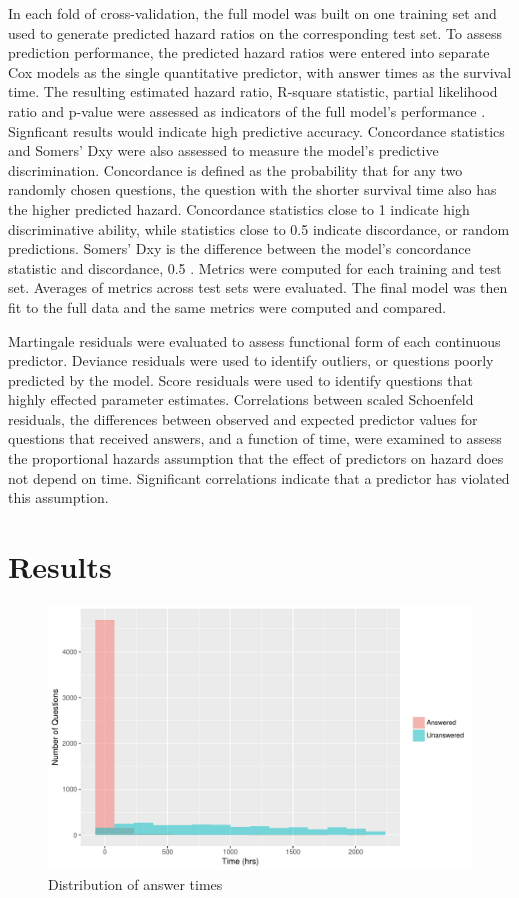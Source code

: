 \documentclass{article}
\begin{document}
In each fold of cross-validation, the full model was built on one training set and used to generate predicted hazard ratios on the corresponding test set. To assess prediction performance, the predicted hazard ratios were entered into separate Cox models as the single quantitative predictor, with answer times as the survival time. The resulting estimated hazard ratio, R-square statistic, partial likelihood ratio and p-value were assessed as indicators of the full model's performance \citep{Chen}. Signficant results would indicate high predictive accuracy. Concordance statistics and Somers' Dxy were also assessed to measure the model's predictive discrimination. Concordance is defined as the probability that for any two randomly chosen questions, the question with the shorter survival time also has the higher predicted hazard. Concordance statistics close to 1 indicate high discriminative ability, while statistics close to 0.5 indicate discordance, or random predictions. Somers' Dxy is the difference between the model's concordance statistic and discordance, 0.5 \citep{Harrell2015}. Metrics were computed for each training and test set. Averages of metrics across test sets were evaluated. The final model was then fit to the full data and the same metrics were computed and compared. 

Martingale residuals were evaluated to assess functional form of each continuous predictor. Deviance residuals were used to identify outliers, or questions poorly predicted by the model. Score residuals were used to identify questions that highly effected parameter estimates. Correlations between scaled Schoenfeld residuals, the differences between observed and expected predictor values for questions that received answers, and a function of time, were examined to assess the proportional hazards assumption that the effect of predictors on hazard does not depend on time. Significant correlations indicate that a predictor has violated this assumption. 

\section*{Results}


\begin{figure}[h!]
  \includegraphics[scale=1]{times_dist.pdf}
  \caption{Distribution of answer times}
  \label{fig:answertimes}
\end{figure}
\end{document}
